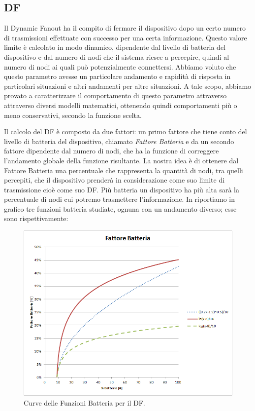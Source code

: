 \subsection{\acf{DF}}
Il Dynamic Fanout ha il compito di fermare il dispositivo dopo un certo numero di trasmissioni effettuate con successo per una certa informazione. Questo valore limite è calcolato in modo dinamico, dipendente dal livello di batteria del dispositivo e dal numero di nodi che il sistema riesce a percepire, quindi al numero di nodi ai quali può potenzialmente connettersi. Abbiamo voluto che questo parametro avesse un particolare andamento e rapidità di risposta in particolari situazioni e altri andamenti per altre situazioni. A tale scopo, abbiamo provato a caratterizzare il comportamento di questo parametro attraverso attraverso diversi modelli matematici, ottenendo quindi comportamenti più o meno conservativi, secondo la funzione scelta.

Il calcolo del DF è composto da due fattori: un primo fattore che tiene conto del livello di batteria del dispositivo, chiamato \textit{Fattore Batteria} e da un secondo fattore dipendente dal numero di nodi, che ha la funzione di correggere l'andamento globale della funzione risultante. La nostra idea è di ottenere dal Fattore Batteria una percentuale che rappresenta la quantità di nodi, tra quelli percepiti, che il dispositivo prenderà in considerazione come suo limite di trasmissione cioè come suo DF. Più batteria un dispositivo ha più alta sarà la percentuale di nodi cui potremo trasmettere l'informazione. In  riportiamo in grafico tre funzioni batteria studiate, ognuna con un andamento diverso; esse sono rispettivamente:
\begin{figure}[tb]
	\centering
	\includegraphics[width=0.9\linewidth, keepaspectratio]{Images/grafici_usati/DF_battery_factor}
	\caption[Curve Fattore Fatteria (DF).]{Curve delle Funzioni Batteria per il DF.}
	\label{fig:DF_battery_factor}
\end{figure}


